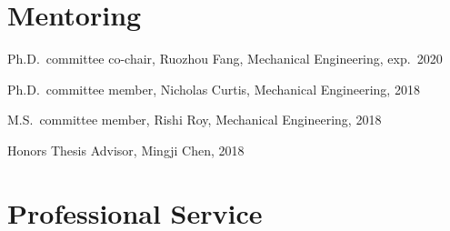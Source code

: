 \vspace{-0.25\baselineskip}

\section{\sectionfont{} Mentoring}

\begin{lonelist}
\item Ph.D.\ committee co-chair, Ruozhou Fang, Mechanical Engineering, exp.\ 2020
\item Ph.D.\ committee member, Nicholas Curtis, Mechanical Engineering, 2018
\item M.S.\ committee member, Rishi Roy, Mechanical Engineering, 2018
\item Honors Thesis Advisor, Mingji Chen, 2018
\end{lonelist}


\section{{\sectionfont Professional Service}}


